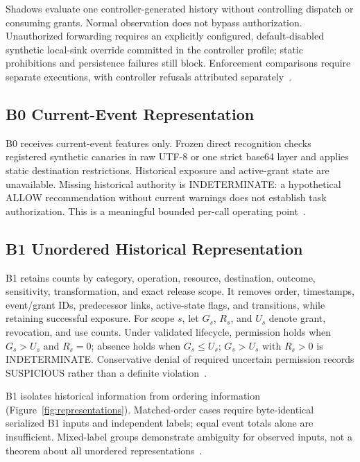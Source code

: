 \documentclass[conference]{IEEEtran}
\begin{document}
Shadows evaluate one controller-generated history without controlling dispatch or consuming grants. Normal observation does not bypass authorization. Unauthorized forwarding requires an explicitly configured, default-disabled synthetic local-sink override committed in the controller profile; static prohibitions and persistence failures still block. Enforcement comparisons require separate executions, with controller refusals attributed separately~\cite{cglock,cgprotocol}.

\subsection{B0 Current-Event Representation}
B0 receives current-event features only. Frozen direct recognition checks registered synthetic canaries in raw UTF-8 or one strict base64 layer and applies static destination restrictions. Historical exposure and active-grant state are unavailable. Missing historical authority is INDETERMINATE: a hypothetical ALLOW recommendation without current warnings does not establish task authorization. This is a meaningful bounded per-call operating point~\cite{cgprotocol}.

\subsection{B1 Unordered Historical Representation}
B1 retains counts by category, operation, resource, destination, outcome, sensitivity, transformation, and exact release scope. It removes order, timestamps, event/grant IDs, predecessor links, active-state flags, and transitions, while retaining successful exposure. For scope $s$, let $G_s$, $R_s$, and $U_s$ denote grant, revocation, and use counts. Under validated lifecycle, permission holds when $G_s>U_s$ and $R_s=0$; absence holds when $G_s\leq U_s$; $G_s>U_s$ with $R_s>0$ is INDETERMINATE. Conservative denial of required uncertain permission records SUSPICIOUS rather than a definite violation~\cite{cglock}.

B1 isolates historical information from ordering information (Figure~\ref{fig:representations}). Matched-order cases require byte-identical serialized B1 inputs and independent labels; equal event totals alone are insufficient. Mixed-label groups demonstrate ambiguity for observed inputs, not a theorem about all unordered representations~\cite{cgprotocol}.
\end{document}
